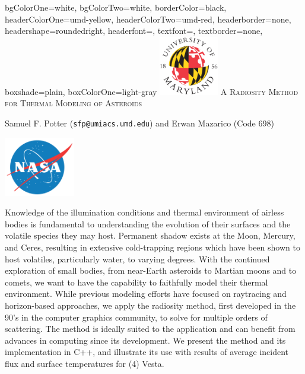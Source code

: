 \documentclass[final,paperwidth=36in,paperheight=45in]{baposter}
\begin{document}

\newcommand{\mat}[1]{\boldsymbol{#1}}
\renewcommand{\refname}{}

\begin{poster}
  {
    bgColorOne=white,
    bgColorTwo=white,
    borderColor=black,
    headerColorOne=umd-yellow,
    headerColorTwo=umd-red,
    headerborder=none,
    headershape=roundedright,
    headerfont=\Large\textsc,
    textfont=\normalsize,
    textborder=none,
    boxshade=plain,
    boxColorOne=light-gray
  }
  {
    \includegraphics[height=7em]{umd-ball.jpg}
  }
  {
    \textsc{A Radiosity Method for Thermal Modeling of Asteroids}\vspace{0.5em}
  }
  {
    Samuel F. Potter (\texttt{sfp@umiacs.umd.edu}) and Erwan Mazarico (Code 698)
    
  }
  {
    \includegraphics[height=7em]{nasa_logo.png}
  }

  {
    Knowledge of the illumination conditions and thermal environment
    of airless bodies is fundamental to understanding the evolution of
    their surfaces and the volatile species they may host. Permanent
    shadow exists at the Moon, Mercury, and Ceres, resulting in
    extensive cold-trapping regions which have been shown to host
    volatiles, particularly water, to varying degrees. With the
    continued exploration of small bodies, from near-Earth
    asteroids to Martian moons and to comets, we want to have the
    capability to faithfully model their thermal environment.  While
    previous modeling efforts have focused on raytracing and
    horizon-based approaches, we apply the radiosity method, first
    developed in the 90’s in the computer graphics community, to solve
    for multiple orders of scattering. The method is ideally suited to
    the application and can benefit from advances in computing since
    its development. We present the method and its implementation in
    C++, and illustrate its use with results of average incident flux
    and surface temperatures for (4) Vesta.
  }


\end{poster}
\end{document}
